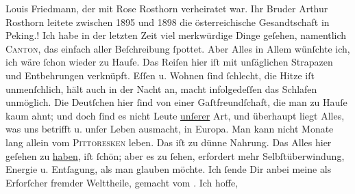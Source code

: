 \begin{ledgroupsized}[t]{13cm}
{{{                     Louis Friedmann, der mit Rose Rosthorn verheiratet war. Ihr Bruder
                     Arthur Rosthorn leitete zwischen
                     1895 und 1898 die österreichische Gesandtschaft in
                     Peking.}}}\label{K_L02845-1h}!\pend
           \pstart
           Ich habe in der letzten {\pb}Zeit viel merkwürdige Dinge
               geſehen, namentlich \textsc{Canton}, das einfach aller Beſchreibung ſpottet.\pend
           \pstart
           Aber Alles in Allem wünſchte ich, ich wäre ſchon wieder zu Haufe. Das Reiſen hier iſt
               mit unſäglichen Strapazen und Entbehrungen verknüpft. Eſſen u. Wohnen ſind ſchlecht,
               die Hitze iſt \strikeout{\textcolor{gray}{e}\textcolor{gray}{×}} unmenſchlich, hält auch in der Nacht an,
               macht infolgedeſſen das Schlafen unmöglich. Die Deutſchen hier ſind von einer {\pb}Gaſtfreundſchaft, die man zu Hauſe kaum ahnt; und doch ſind es nicht Leute \uline{unſerer} Art, und überhaupt liegt Alles, was uns
               betrifft u. unſer Leben ausmacht, in Europa.  Man kann nicht Monate lang allein vom \textsc{Pittoresken} leben. Das iſt zu dünne Nahrung. Das Alles hier
               geſehen zu \uline{haben}, iſt ſchön;  aber es zu ſehen, erfordert
               mehr Selbſtüberwindung, Energie u. Entſagung, als man
               glauben möchte.\pend
           \pstart
           Ich ſende Dir anbei meine \label{K_L02845-2v}\label{K_L02845-2h} als
               Erforſcher  fremder Welttheile, gemacht vom \label{K_L02845-3v}\label{K_L02845-3h}. Ich hoffe,

\end{ledgroupsized}
